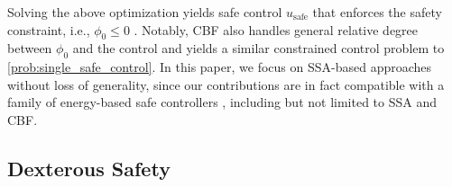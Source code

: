 Solving the above optimization yields safe control $u_\mathrm{safe}$ that enforces the safety constraint, i.e.,  $\phi_0\leq 0$ \cite{liu2014control, chen2023sis}.
Notably, CBF also handles general relative degree between $\phi_0$ and the control \cite{wang2023high} and yields a similar constrained control problem to \eqref{prob:single_safe_control}.
In this paper, we focus on SSA-based approaches without loss of generality, since our contributions are in fact compatible with a family of energy-based safe controllers \cite{wei2019unified}, including but not limited to SSA and CBF.


\subsection{Dexterous Safety}


